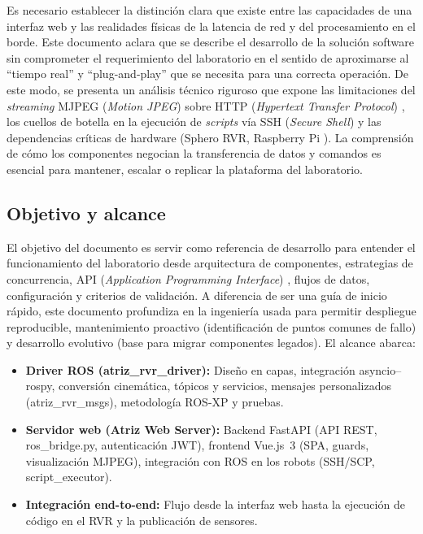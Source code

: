 \documentclass[12pt]{article}
\numberwithin{figure}{section}
\numberwithin{table}{section}
\def\code#1{#1}%
\def\file#1{#1}%
\newcommand{\code}[1]{\textcolor{codeblue}{\url{#1}}}
\newcommand{\file}[1]{\textcolor{darkblue}{\url{#1}}}
\begin{document}
Es necesario establecer la distinción clara que existe entre las capacidades de una interfaz web y las realidades físicas de la latencia de red y del procesamiento en el borde. Este documento aclara que se describe el desarrollo de la solución software sin comprometer el requerimiento del laboratorio en el sentido de aproximarse al ``tiempo real'' y ``plug-and-play'' que se necesita para una correcta operación. De este modo, se presenta un análisis técnico riguroso que expone las limitaciones del \textit{streaming} MJPEG (\textit{Motion JPEG}) sobre HTTP (\textit{Hypertext Transfer Protocol}) \cite{RFC9110_HTTP_Semantics}, los cuellos de botella en la ejecución de \textit{scripts} vía SSH (\textit{Secure Shell}) \cite{RFC4251_SSH_Architecture} y las dependencias críticas de hardware (Sphero RVR, Raspberry Pi \cite{RaspberryPi_Website}). La comprensión de cómo los componentes negocian la transferencia de datos y comandos es esencial para mantener, escalar o replicar la plataforma del laboratorio.


\subsection{Objetivo y alcance}

El objetivo del documento es servir como referencia de desarrollo para entender el funcionamiento del laboratorio desde arquitectura de componentes, estrategias de concurrencia, API (\textit{Application Programming Interface}) \cite{FastAPI_Docs}, flujos de datos, configuración y criterios de validación. A diferencia de ser una guía de inicio rápido, este documento profundiza en la ingeniería usada para permitir despliegue reproducible, mantenimiento proactivo (identificación de puntos comunes de fallo) y desarrollo evolutivo (base para migrar componentes legados). El alcance abarca:

\begin{itemize}
    \item \textbf{Driver ROS (atriz\_rvr\_driver):} Diseño en capas, integración asyncio--rospy, conversión cinemática, tópicos y servicios, mensajes personalizados (\code{atriz\_rvr\_msgs}), metodología ROS-XP y pruebas.
    \item \textbf{Servidor web (Atriz Web Server):} Backend FastAPI (API REST, \file{ros\_bridge.py}, autenticación JWT), frontend Vue.js~3 (SPA, guards, visualización MJPEG), integración con ROS en los robots (SSH/SCP, \code{script\_executor}).
    \item \textbf{Integración end-to-end:} Flujo desde la interfaz web hasta la ejecución de código en el RVR y la publicación de sensores.
\end{itemize}
\end{document}
